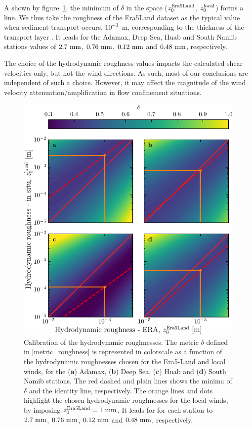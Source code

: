 A shown by figure~\ref{Fig3_supp}, the minimum of $\delta$ in the space ($z_{0}^{\textup{Era5Land}}$, $z_{0}^{\textup{local}}$) forms a line. We thus take the roughness of the Era5Land dataset as the typical value when sediment transport occurs, $10^{-3}$~m, corresponding to the thickness of the transport layer \citep{Duran2011}. It leads for the Adamax, Deep Sea, Huab and South Namib stations values of $2.7~\textup{mm}$, $0.76~\textup{mm}$, $0.12~\textup{mm}$ and $0.48~\textup{mm}$, respectively.

The choice of the hydrodynamic roughness values impacts the calculated shear velocities only, but not the wind directions. As such, most of our conclusions are independent of such a choice. However, it may affect the magnitude of the wind velocity attenuation/amplification in flow confinement situations.


\begin{figure}
  \centering
  \includegraphics[scale=1]{Figures/Figure3_supp.pdf}
  \caption{Calibration of the hydrodynamic roughnesses. The metric $\delta$ defined in \eqref{metric_roughness} is represented in colorscale as a function of the hydrodynamic roughnesses chosen for the Era5-Land and local winds, for the (\textbf{a}) Adamax, (\textbf{b}) Deep Sea, (\textbf{c}) Huab and (\textbf{d}) South Namib stations. The red dashed and plain lines shows the minima of $\delta$ and the identity line, respectively. The orange lines and dots highlight the chosen hydrodynamic roughnesses for the local winds, by imposing $z_{0}^{\textup{Era5Land}} = 1~\textup{mm}$. It leads for for each station to $2.7~\textup{mm}$, $0.76~\textup{mm}$, $0.12~\textup{mm}$ and $0.48~\textup{mm}$, respectively.}
  \label{Fig3_supp}
\end{figure}


